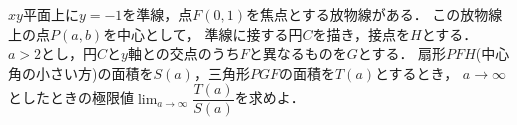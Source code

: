 \documentclass[../../main.tex]{subfiles}
\begin{document}
$xy$平面上に$y=-1$を準線，点$F(0,1)$を焦点とする放物線がある．
この放物線上の点$P(a,b)$を中心として，
準線に接する円$C$を描き，接点を$H$とする．
$a>2$とし，円$C$と$y$軸との交点のうち$F$と異なるものを$G$とする．
扇形$PFH$(中心角の小さい方)の面積を$S(a)$，三角形$PGF$の面積を$T(a)$とするとき，
$a\to\infty$としたときの極限値$\displaystyle\lim_{a\to\infty}\dfrac{T(a)}{S(a)}$を求めよ．
\end{document}
